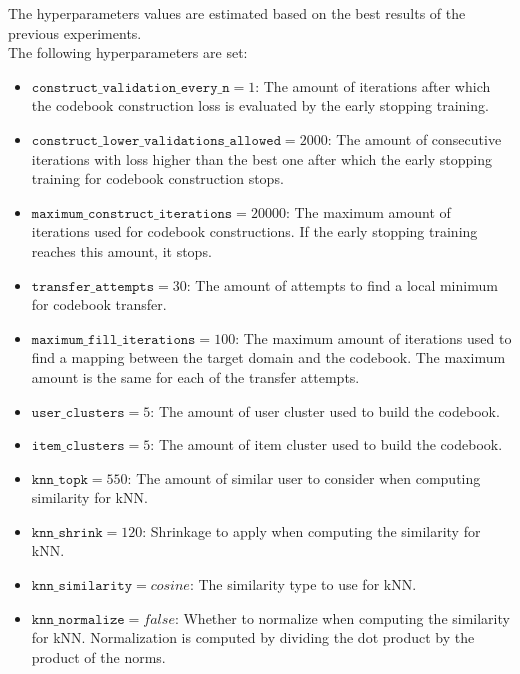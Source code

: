 The hyperparameters values are estimated based on the best results of the previous experiments.\\
The following hyperparameters are set:
\begin{itemize}
\item $\texttt{construct\_validation\_every\_n} = 1$: The amount of iterations after which the codebook construction loss is evaluated by the early stopping training.
\item $\texttt{construct\_lower\_validations\_allowed} = 2000$: The amount of consecutive iterations with loss higher than the best one after which the early stopping training for codebook construction stops.
\item $\texttt{maximum\_construct\_iterations} = 20000$: The maximum amount of iterations used for codebook constructions. If the early stopping training reaches this amount, it stops.
\item $\texttt{transfer\_attempts} = 30$: The amount of attempts to find a local minimum for codebook transfer.
\item $\texttt{maximum\_fill\_iterations} = 100$: The maximum amount of iterations used to find a mapping between the target domain and the codebook. The maximum amount is the same for each of the transfer attempts.
\item $\texttt{user\_clusters} = 5$: The amount of user cluster used to build the codebook.
\item $\texttt{item\_clusters} = 5$: The amount of item cluster used to build the codebook.
\item $\texttt{knn\_topk} = 550$: The amount of similar user to consider when computing similarity for kNN.
\item $\texttt{knn\_shrink} = 120$: Shrinkage to apply when computing the similarity for kNN.
\item $\texttt{knn\_similarity} = cosine$: The similarity type to use for kNN.
\item $\texttt{knn\_normalize} = false$: Whether to normalize when computing the similarity for kNN. Normalization is computed by dividing the dot product by the product of the norms.
\end{itemize}


